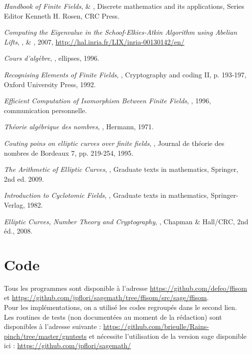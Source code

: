 \documentclass[a4paper]{article} %
\numberwithin{section}{part}
\numberwithin{equation}{section}
\begin{document}
\begin{thebibliography}{LC}
 \emph{Handbook of Finite Fields},  \& 
, Discrete mathematics and its applications, Series Editor 
Kenneth H. Rosen, CRC Press.

 \emph{Computing the Eigenvalue in the Schoof-Elkies-Atkin
Algorithm using Abelian Lifts}, ,  \&
, 2007, 
\url{http://hal.inria.fr/LIX/inria-00130142/en/}

 \emph{Cours d'algèbre}, , ellipses, 1996.

 \emph{Recognising Elements of Finite Fields}, , Cryptography and coding II, p. 193-197, Oxford University Press, 1992.

 \emph{Efficient Computation of Isomorphism Between Finite Fields},
, 1996, communication personnelle.

 \emph{Théorie algébrique des nombres}, , 
Hermann, 1971.

 \emph{Couting poins on elliptic curves over finite fields},
, Journal de théorie des nombres de Bordeaux 7, pp. 219-254,
1995.

 \emph{The Arithmetic of Elliptic Curves}, 
, Graduate texts in mathematics, Springer, 2nd ed. 
2009.

 \emph{Introduction to Cyclotomic Fields}, , Graduate texts in mathematics, Springer-Verlag, 1982.

 \emph{Elliptic Curves, Number Theory and Cryptography},
, Chapman \& Hall/CRC, 2nd éd., 2008.

\end{thebibliography}
\newpage
\appendix
{}
\section{Code}
\label{code}
Tous les programmes sont disponible à l'adresse
\url{https://github.com/defeo/ffisom} et
\url{https://github.com/jpflori/sagemath/tree/ffisom/src/sage/ffisom}.\\
Pour les implémentations, on a utilisé les codes regroupés dans le second
lien.\\
Les routines de tests (non documentées au moment de la rédaction) sont 
disponibles à l'adresse suivante :
\url{https://github.com/brieulle/Rains-pinch/tree/master/gnutests} et nécessite 
l'utilisation de la version sage disponible ici : 
\url{https://github.com/jpflori/sagemath/}
\end{document}
